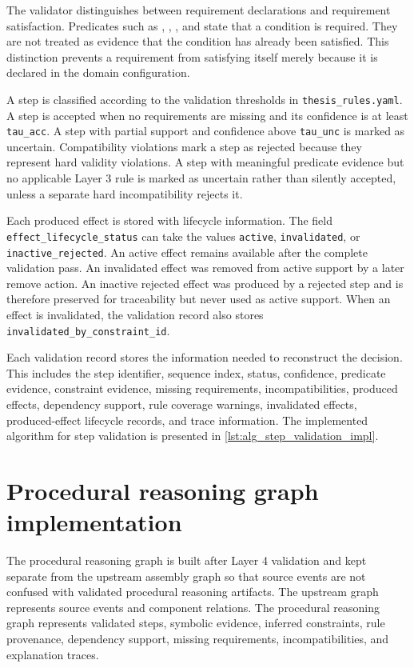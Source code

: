 The validator distinguishes between requirement declarations and requirement satisfaction. Predicates such as , , , and  state that a condition is required. They are not treated as evidence that the condition has already been satisfied. This distinction prevents a requirement from satisfying itself merely because it is declared in the domain configuration.

A step is classified according to the validation thresholds in \texttt{thesis\_rules.yaml}. A step is accepted when no requirements are missing and its confidence is at least \texttt{tau\_acc}. A step with partial support and confidence above \texttt{tau\_unc} is marked as uncertain. Compatibility violations mark a step as rejected because they represent hard validity violations. A step with meaningful predicate evidence but no applicable Layer 3 rule is marked as uncertain rather than silently accepted, unless a separate hard incompatibility rejects it.

Each produced effect is stored with lifecycle information. The field \texttt{effect\_lifecycle\_status} can take the values \texttt{active}, \texttt{invalidated}, or \texttt{inactive\_rejected}. An active effect remains available after the complete validation pass. An invalidated effect was removed from active support by a later remove action. An inactive rejected effect was produced by a rejected step and is therefore preserved for traceability but never used as active support. When an effect is invalidated, the validation record also stores \texttt{invalidated\_by\_constraint\_id}.

Each validation record stores the information needed to reconstruct the decision. This includes the step identifier, sequence index, status, confidence, predicate evidence, constraint evidence, missing requirements, incompatibilities, produced effects, dependency support, rule coverage warnings, invalidated effects, produced-effect lifecycle records, and trace information. The implemented algorithm for step validation is presented in \cref{lst:alg_step_validation_impl}.

\section{Procedural reasoning graph implementation}
\label{sec:implementation-procedural-graph}

The procedural reasoning graph is built after Layer 4 validation and kept separate from the upstream assembly graph so that source events are not confused with validated procedural reasoning artifacts. The upstream graph represents source events and component relations. The procedural reasoning graph represents validated steps, symbolic evidence, inferred constraints, rule provenance, dependency support, missing requirements, incompatibilities, and explanation traces.

